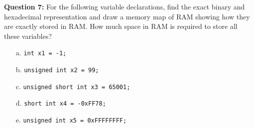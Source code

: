 \documentclass[12pt,a4paper]{article}
\begin{document}
\noindent\textbf{Question 7:} For the following variable declarations, find the exact binary and hexadecimal representation and draw a memory map of RAM showing how they are exactly stored in RAM. How much space in RAM is required to store all these variables?
\begin{enumerate}
\item[a.] \verb|int x1 = -1;|
\item[b.] \verb|unsigned int x2 = 99;|
\item[c.] \verb|unsigned short int x3 = 65001;|
\item[d.] \verb|short int x4 = -0xFF78;|
\item[e.] \verb|unsigned int x5 = 0xFFFFFFFF;|
\end{enumerate}
\end{document}
